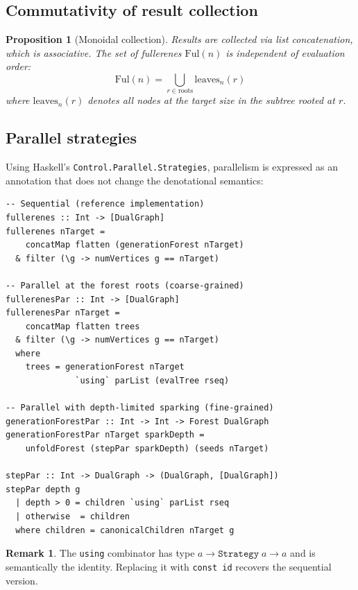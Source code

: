 \documentclass[11pt,a4paper]{article}
\newtheorem{proposition}[theorem]{Proposition}
\theoremstyle{definition}
\newtheorem{remark}[theorem]{Remark}
\newcommand{\Ful}{\mathrm{Ful}}
\begin{document}
\subsection{Commutativity of result collection}

\begin{proposition}[Monoidal collection]
Results are collected via list concatenation, which is associative.
The set of fullerenes $\Ful(n)$ is independent of evaluation order:
\[
  \Ful(n) = \bigcup_{r \in \mathrm{roots}} \mathrm{leaves}_n(r)
\]
where $\mathrm{leaves}_n(r)$ denotes all nodes at the target size in
the subtree rooted at $r$.
\end{proposition}

\subsection{Parallel strategies}

Using Haskell's \texttt{Control.Parallel.Strategies}, parallelism is
expressed as an annotation that does not change the denotational
semantics:

\begin{lstlisting}
-- Sequential (reference implementation)
fullerenes :: Int -> [DualGraph]
fullerenes nTarget =
    concatMap flatten (generationForest nTarget)
  & filter (\g -> numVertices g == nTarget)

-- Parallel at the forest roots (coarse-grained)
fullerenesPar :: Int -> [DualGraph]
fullerenesPar nTarget =
    concatMap flatten trees
  & filter (\g -> numVertices g == nTarget)
  where
    trees = generationForest nTarget
              `using` parList (evalTree rseq)

-- Parallel with depth-limited sparking (fine-grained)
generationForestPar :: Int -> Int -> Forest DualGraph
generationForestPar nTarget sparkDepth =
    unfoldForest (stepPar sparkDepth) (seeds nTarget)

stepPar :: Int -> DualGraph -> (DualGraph, [DualGraph])
stepPar depth g
  | depth > 0 = children `using` parList rseq
  | otherwise  = children
  where children = canonicalChildren nTarget g
\end{lstlisting}

\begin{remark}
The \texttt{using} combinator has type
$a \to \texttt{Strategy}\;a \to a$ and is semantically the identity.
Replacing it with \texttt{const id} recovers the sequential version.
\end{remark}
\end{document}
